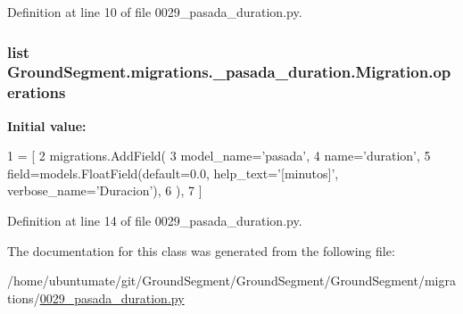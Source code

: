 Definition at line 10 of file 0029\+\_\+pasada\+\_\+duration.\+py.

\hypertarget{class_ground_segment_1_1migrations_1_10029__pasada__duration_1_1_migration_a30edd8ca1d10f051913bb824b42696af}{}
\subsubsection[{operations}]{\setlength{\rightskip}{0pt plus 5cm}list Ground\+Segment.\+migrations.\+\_\+pasada\+\_\+duration.\+Migration.\+operations\hspace{0.3cm}{\ttfamily [static]}}\label{class_ground_segment_1_1migrations_1_10029__pasada__duration_1_1_migration_a30edd8ca1d10f051913bb824b42696af}
{\bfseries Initial value\+:}
\begin{DoxyCode}
1 = [
2         migrations.AddField(
3             model\_name=\textcolor{stringliteral}{'pasada'},
4             name=\textcolor{stringliteral}{'duration'},
5             field=models.FloatField(default=0.0, help\_text=\textcolor{stringliteral}{'[minutos]'}, verbose\_name=\textcolor{stringliteral}{'Duracion'}),
6         ),
7     ]
\end{DoxyCode}


Definition at line 14 of file 0029\+\_\+pasada\+\_\+duration.\+py.



The documentation for this class was generated from the following file\+:\begin{DoxyCompactItemize}
\item 
/home/ubuntumate/git/\+Ground\+Segment/\+Ground\+Segment/\+Ground\+Segment/migrations/\hyperlink{0029__pasada__duration_8py}{0029\+\_\+pasada\+\_\+duration.\+py}\end{DoxyCompactItemize}
